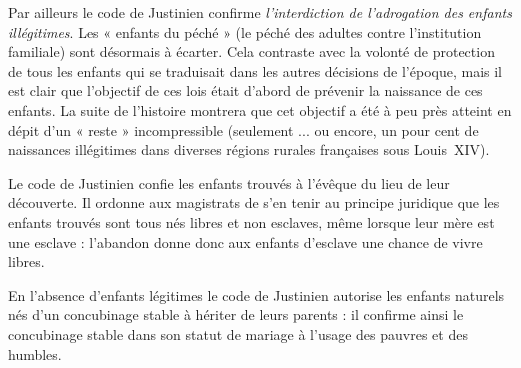 \begin{description}
 Par ailleurs le code de Justinien confirme \emph{l'interdiction de l'adrogation des enfants illégitimes}. Les « enfants du péché » (le péché des adultes contre l'institution familiale) sont désormais à écarter. Cela contraste avec la volonté de protection de tous les enfants qui se traduisait dans les autres décisions de l'époque, mais il est clair que l'objectif de ces lois était d'abord de prévenir la naissance de ces enfants. La suite de l'histoire montrera que cet objectif a été à peu près atteint en dépit d'un « reste » incompressible (seulement ... ou encore, un pour cent de naissances illégitimes dans diverses régions rurales françaises sous Louis~XIV). 

 Le code de Justinien confie les enfants trouvés à l'évêque du lieu de leur découverte. Il ordonne aux magistrats de s'en tenir au principe juridique que les enfants trouvés sont tous nés libres et non esclaves, même lorsque leur mère est une esclave : l'abandon donne donc aux enfants d'esclave une chance de vivre libres. 

 En l'absence d'enfants légitimes le code de Justinien autorise les enfants naturels nés d'un concubinage stable à hériter de leurs parents : il confirme ainsi le concubinage stable dans son statut de mariage à l'usage des pauvres et des humbles. 
\end{description}


